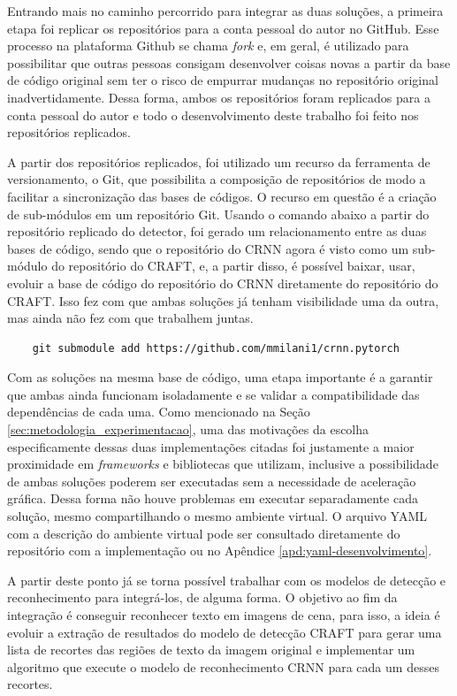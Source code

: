 Entrando mais no caminho percorrido para integrar as duas soluções, a primeira etapa foi replicar os repositórios para a conta pessoal do autor no GitHub. 
Esse processo na plataforma Github se chama \textit{fork} e, em geral, é utilizado para possibilitar que outras pessoas consigam desenvolver coisas 
novas a partir da base de código original sem ter o risco de empurrar mudanças no repositório original inadvertidamente. Dessa forma, ambos os repositórios 
foram replicados para a conta pessoal do autor e todo o desenvolvimento deste trabalho foi feito nos repositórios replicados.

A partir dos repositórios replicados, foi utilizado um recurso da ferramenta de versionamento, o Git, que possibilita a composição de repositórios de modo 
a facilitar a sincronização das bases de códigos. O recurso em questão é a criação de sub-módulos em um repositório Git. Usando o comando abaixo a partir 
do repositório replicado do detector, foi gerado um relacionamento entre as duas bases de código, sendo que o repositório do CRNN agora é visto como um 
sub-módulo do repositório do CRAFT, e, a partir disso, é possível baixar, usar, evoluir a base de código do repositório do CRNN diretamente do repositório 
do CRAFT. Isso fez com que ambas soluções já tenham visibilidade uma da outra, mas ainda não fez com que trabalhem juntas.

\begin{verbatim}
    git submodule add https://github.com/mmilani1/crnn.pytorch
\end{verbatim}

Com as soluções na mesma base de código, uma etapa importante é a garantir que ambas ainda funcionam isoladamente e se validar a compatibilidade das dependências 
de cada uma. Como mencionado na Seção \ref{sec:metodologia_experimentacao}, uma das motivações da escolha especificamente dessas duas implementações citadas foi 
justamente a maior proximidade em \textit{frameworks} e bibliotecas que utilizam, inclusive a possibilidade de ambas soluções poderem ser executadas sem a 
necessidade de aceleração gráfica. Dessa forma não houve problemas em executar separadamente cada solução, mesmo compartilhando o mesmo ambiente virtual. 
O arquivo YAML com a descrição do ambiente virtual pode ser consultado diretamente do repositório com a implementação ou no Apêndice \ref{apd:yaml-desenvolvimento}.

A partir deste ponto já se torna possível trabalhar com os modelos de detecção e reconhecimento para integrá-los, de alguma forma. O objetivo ao fim da integração 
é conseguir reconhecer texto em imagens de cena, para isso, a ideia é evoluir a extração de resultados do modelo de detecção CRAFT para gerar uma lista de 
recortes das regiões de texto da imagem original e implementar um algoritmo que execute o modelo de reconhecimento CRNN para cada um desses recortes.

